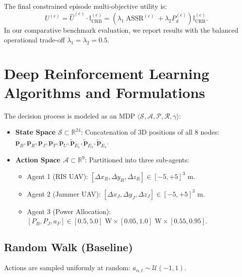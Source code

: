 \documentclass[journal,onecolumn]{IEEEtran}
\begin{document}
The final constrained episode multi-objective utility is:
\begin{equation}
    U^{(e)} = \widehat{U}^{(e)} \cdot \mathbb{I}_{\text{CRB}}^{(e)} = \left( \lambda_1 \operatorname{ASSR}^{(e)} + \lambda_2 P_d^{(e)} \right) \mathbb{I}_{\text{CRB}}^{(e)}.
\end{equation}
In our comparative benchmark evaluation, we report results with the balanced operational trade-off $\lambda_1 = \lambda_2 = 0.5$.

\section{Deep Reinforcement Learning Algorithms and Formulations}
The decision process is modeled as an MDP $\langle \mathcal{S}, \mathcal{A}, \mathcal{P}, \mathcal{R}, \gamma \rangle$:
\begin{itemize}
    \item \textbf{State Space $\mathcal{S} \subset \mathbb{R}^{24}$}: Concatenation of 3D positions of all 8 nodes: $\mathbf{p}_B, \mathbf{p}_R, \mathbf{p}_J, \mathbf{p}_T, \mathbf{p}_U, \widetilde{\mathbf{p}}_{E_1}, \widetilde{\mathbf{p}}_{E_2}, \widetilde{\mathbf{p}}_{E_3}$.
    \item \textbf{Action Space $\mathcal{A} \subset \mathbb{R}^9$}: Partitioned into three sub-agents:
    \begin{itemize}
        \item Agent 1 (RIS UAV): $[\Delta x_R, \Delta y_R, \Delta z_R] \in [-5, +5]^3\text{ m}$.
        \item Agent 2 (Jammer UAV): $[\Delta x_J, \Delta y_J, \Delta z_J] \in [-5, +5]^3\text{ m}$.
        \item Agent 3 (Power Allocation): $[P_B, P_J, a_F] \in [0.5, 5.0]\text{ W} \times [0.05, 1.0]\text{ W} \times [0.55, 0.95]$.
    \end{itemize}
\end{itemize}

\subsection{Random Walk (Baseline)}
Actions are sampled uniformly at random: $a_{n,t} \sim \mathcal{U}(-1, 1)$.
\end{document}

